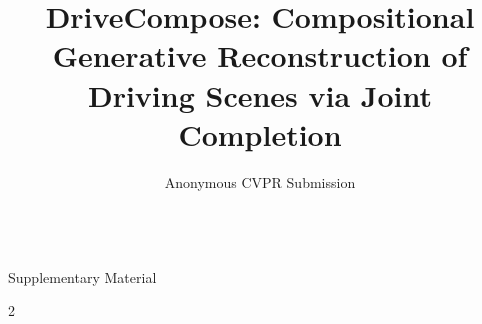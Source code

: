 \documentclass[10pt,twocolumn,letterpaper]{article}
\title{DriveCompose: Compositional Generative Reconstruction of Driving Scenes via Joint Completion}
\author{Anonymous CVPR Submission}
\begin{document}
\onecolumn
\setcounter{topnumber}{5}
\setcounter{dbltopnumber}{5}
\setcounter{totalnumber}{10}
\renewcommand{\topfraction}{0.9}
\renewcommand{\dbltopfraction}{0.9}
\renewcommand{\textfraction}{0.05}
\renewcommand{\floatpagefraction}{0.75}
\renewcommand{\dblfloatpagefraction}{0.75}
\setrunninglinenumbers
\nolinenumbers
\rightlinenumbers
\setlength{\linenumbersep}{7pt}
{\centering\Large
\textbf{\thetitle}\\
\vspace{0.5em}Supplementary Material\\
\vspace{1.0em}\par}
\raggedbottom
\raggedcolumns
\appendix
\renewcommand{\thetable}{S\arabic{table}}
\renewcommand{\theequation}{S\arabic{equation}}
\renewcommand{\thefigure}{S\arabic{figure}}
\linenumbers
\begin{multicols}{2}










{\small


}
\end{multicols}
\end{document}
